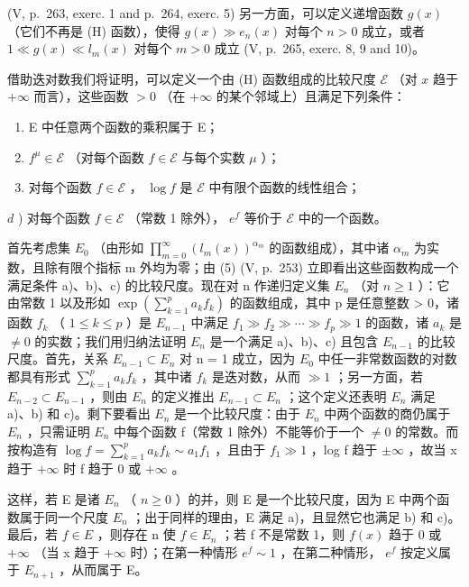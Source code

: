 (V, p.~263, exerc. 1 and p.~264, exerc. 5) 另一方面，可以定义递增函数 \(g(x)\) （它们不再是 (H) 函数），使得 \(g(x) \gg e_n(x)\) 对每个 \(n > 0\) 成立，或者 \(1 \ll g(x) \ll l_m(x)\) 对每个 \(m > 0\) 成立 (V, p.~265, exerc. 8, 9 and 10)。

借助迭对数我们将证明，可以定义一个由 (H) 函数组成的比较尺度 \(\mathcal{E}\) （对 \(x\) 趋于 \(+\infty\) 而言），这些函数 \(>0\) （在 \(+\infty\) 的某个邻域上）且满足下列条件：

\begin{enumerate}
\def\labelenumi{\alph{enumi})}
\item
  E 中任意两个函数的乘积属于 E；
\item
  \(f^{\mu} \in \mathcal{E}\) （对每个函数 \(f \in \mathcal{E}\) 与每个实数 \(\mu\) ）；
\item
  对每个函数 \(f \in \mathcal{E}\) ， \(\log f\) 是 \(\mathcal{E}\) 中有限个函数的线性组合；
\end{enumerate}

\(d\) ) 对每个函数 \(f \in \mathcal{E}\) （常数 1 除外）， \(e^f\) 等价于 \(\mathcal{E}\) 中的一个函数。

首先考虑集 \(E_{0}\) （由形如 \(\prod_{m=0}^{\infty}\left(l_{m}(x)\right)^{\alpha_{m}}\) 的函数组成），其中诸 \(\alpha_{m}\) 为实数，且除有限个指标 m 外均为零；由 (5) (V, p.~253) 立即看出这些函数构成一个满足条件 a)、b)、c) 的比较尺度。现在对 n 作递归定义集 \(E_{n}\) （对 \(n \geqslant 1\) ）：它由常数 1 以及形如 \(\exp\left(\sum_{k=1}^{p}a_{k}f_{k}\right)\) 的函数组成，其中 p 是任意整数 \textgreater{} 0，诸函数 \(f_{k}\) （ \(1 \leqslant k \leqslant p\) ）是 \(E_{n-1}\) 中满足 \(f_{1} \gg f_{2} \gg \cdots \gg f_{p} \gg 1\) 的函数，诸 \(a_{k}\) 是 \(\neq 0\) 的实数；我们用归纳法证明 \(E_{n}\) 是一个满足 a)、b)、c) 且包含 \(E_{n-1}\) 的比较尺度。首先，关系 \(E_{n-1} \subset E_{n}\) 对 n = 1 成立，因为 \(E_{0}\) 中任一非常数函数的对数都具有形式 \(\sum_{k=1}^{p}a_{k}f_{k}\) ，其中诸 \(f_{k}\) 是迭对数，从而 \(\gg 1\) ；另一方面，若 \(E_{n-2} \subset E_{n-1}\) ，则由 \(E_{n}\) 的定义推出 \(E_{n-1} \subset E_{n}\) ；这个定义还表明 \(E_{n}\) 满足 a)、b) 和 c)。剩下要看出 \(E_{n}\) 是一个比较尺度：由于 \(E_{n}\) 中两个函数的商仍属于 \(E_{n}\) ，只需证明 \(E_{n}\) 中每个函数 f（常数 1 除外）不能等价于一个 \(\neq 0\) 的常数。而按构造有 \(\log f = \sum_{k=1}^{p}a_{k}f_{k} \sim a_{1}f_{1}\) ，且由于 \(f_{1} \gg 1\) ，log f 趋于 \(\pm\infty\) ，故当 x 趋于 \(+\infty\) 时 f 趋于 0 或 \(+\infty\) 。

这样，若 E 是诸 \(E_{n}\) （ \(n \geqslant 0\) ）的并，则 E 是一个比较尺度，因为 E 中两个函数属于同一个尺度 \(E_{n}\) ；出于同样的理由，E 满足 a)，且显然它也满足 b) 和 c)。最后，若 \(f \in E\) ，则存在 n 使 \(f \in E_{n}\) ；若 f 不是常数 1，则 \(f(x)\) 趋于 0 或 \(+\infty\) （当 x 趋于 \(+\infty\) 时）；在第一种情形 \(e^{f} \sim 1\) ，在第二种情形， \(e^{f}\) 按定义属于 \(E_{n+1}\) ，从而属于 E。

